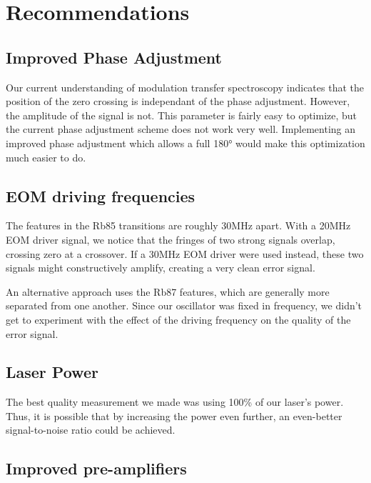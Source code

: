 \newpage

\section{Recommendations}
\label{sec:recommendations}

\subsection{Improved Phase Adjustment}

Our current understanding of modulation transfer spectroscopy indicates that the position of the zero crossing is independant of the phase adjustment.  However, the amplitude of the signal is not.  This parameter is fairly easy to optimize, but the current phase adjustment scheme does not work very well.  Implementing an improved phase adjustment which allows a full 180° would make this optimization much easier to do.

\subsection{EOM driving frequencies}

The features in the Rb85 transitions are roughly 30MHz apart.  With a 20MHz EOM driver signal, we notice that the fringes of two strong signals overlap, crossing zero at a crossover.  If a 30MHz EOM driver were used instead, these two signals might constructively amplify, creating a very clean error signal.

An alternative approach uses the Rb87 features, which are generally more separated from one another.  Since our oscillator was fixed in frequency, we didn't get to experiment with the effect of the driving frequency on the quality of the error signal.

\subsection{Laser Power}

The best quality measurement we made was using 100\% of our laser's power.  Thus, it is possible that by increasing the power even further, an even-better signal-to-noise ratio could be achieved.

\subsection{Improved pre-amplifiers}

